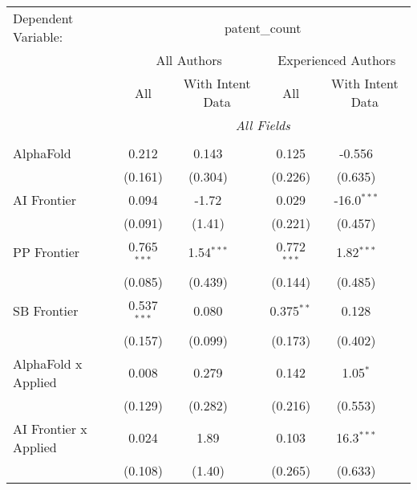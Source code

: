 \begingroup
\centering
\begin{tabular}{lcccccc}
   \tabularnewline \midrule \midrule
   Dependent Variable: & \multicolumn{6}{c}{patent\_count}\\
 & \multicolumn{3}{c}{All Authors} & \multicolumn{3}{c}{Experienced Authors} \\
\cmidrule(lr){2-4} \cmidrule(lr){5-7}
 & \multicolumn{1}{c}{All} & \multicolumn{2}{c}{With Intent Data} & \multicolumn{1}{c}{All} & \multicolumn{2}{c}{With Intent Data} \\
\cmidrule(lr){2-2} \cmidrule(lr){3-4} \cmidrule(lr){5-5} \cmidrule(lr){6-7}
 & \multicolumn{6}{c}{\textit{All Fields}} \\ \\
   AlphaFold                      & 0.212          & 0.143         &               & 0.125          & -0.556        &   \\   
                                  & (0.161)        & (0.304)       &               & (0.226)        & (0.635)       &   \\   
   AI Frontier                    & 0.094          & -1.72         &               & 0.029          & -16.0$^{***}$ &   \\   
                                  & (0.091)        & (1.41)        &               & (0.221)        & (0.457)       &   \\   
   PP Frontier                    & 0.765$^{***}$  & 1.54$^{***}$  &               & 0.772$^{***}$  & 1.82$^{***}$  &   \\   
                                  & (0.085)        & (0.439)       &               & (0.144)        & (0.485)       &   \\   
   SB Frontier                    & 0.537$^{***}$  & 0.080         &               & 0.375$^{**}$   & 0.128         &   \\   
                                  & (0.157)        & (0.099)       &               & (0.173)        & (0.402)       &   \\   
   AlphaFold x Applied            & 0.008          & 0.279         &               & 0.142          & 1.05$^{*}$    &   \\   
                                  & (0.129)        & (0.282)       &               & (0.216)        & (0.553)       &   \\   
   AI Frontier x Applied          & 0.024          & 1.89          &               & 0.103          & 16.3$^{***}$  &   \\   
                                  & (0.108)        & (1.40)        &               & (0.265)        & (0.633)       &   \\   

\end{tabular}
